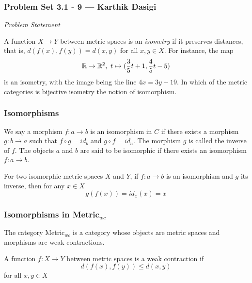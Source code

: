 
\begin{frame}
    \frametitle{Problem Set 3.1 - 9 --- Karthik Dasigi}
    \emph{Problem Statement}

    A function \(X\rightarrow Y\) between metric spaces is an \textit{isometry} if 
    it preserves distances, that is, \(d(f(x),f(y))=d(x,y)\) for all \(x,y \in X\).
    For instance, the map
    \begin{equation}
        \mathbb{R} \rightarrow \mathbb{R}^2 , \text{    } t \mapsto (\frac{3}{5}t+1, \frac{4}{5}t -5)
    \end{equation}
    is an isometry, with the image being the line \(4x =3y + 19\). 
    In which of the metric categories is bijective isometry the notion of isomorphism.
\end{frame}

\begin{frame}
    \frametitle{Isomorphisms}
    \begin{definition}[Isomorphism]
        We say a morphism \(f : a \rightarrow b\) is an isomorphism in \(C\) if there exists a morphism
        \(g : b \rightarrow a\) such that \(f \circ g = id_b\) and \(g \circ f = id_a\). The morphism \(g\) is called the inverse
        of \(f\). The objects \(a\) and \(b\) are said to be isomorphic if there exists an isomorphism \(f:a\rightarrow b\).
    \end{definition}
    \pause
    For two isomorphic metric spaces \(X\) and \(Y\), if \(f:a\rightarrow b\) is an isomorphism and \(g\) its inverse,
    then for any \(x\in X\)
    \begin{equation}
        g(f(x))=id_x(x)=x 
        \label{eqn:gfresult}
    \end{equation}
    
\end{frame}

\begin{frame}
    \frametitle{Isomorphisms in Metric\(_{wc}\)}
    The category Metric\(_{wc}\) is a category whose objects are metric spaces and morphisms are weak contractions.
    \pause
    \begin{definition}
        A function \(f : X \rightarrow Y\) between metric spaces is a
        weak contraction if
        \begin{equation}
            d(f(x),f(y))\leq d(x,y)
            \label{eqn:wc}
        \end{equation}
        for all \(x,y\in X\)
    \end{definition}

\end{frame}

